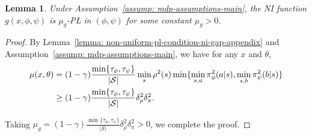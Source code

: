 \documentclass{article}
\theoremstyle{plain}
\newtheorem{lemma}{Lemma}
\theoremstyle{definition}
\theoremstyle{remark}
\def\cS{\mathcal S}
\begin{document}
\begin{lemma}
    \label{lemma: pl-condition-ni-gap}
    Under Assumption~\ref{assump: mdp-assumptions-main}, the NI function $g(x,\phi,\psi)$ is $\mu_g$-P{\L} in $(\phi,\psi)$ for some constant $\mu_g>0$.
\end{lemma}
\begin{proof}
    By Lemma~\ref{lemma: non-uniform-pl-condition-ni-gap-appendix} and Assumption~\ref{assump: mdp-assumptions-main}, we have for any $x$ and $\theta$,
    \begin{align}
        \mu(x,\theta) & = (1-\gamma)\frac{\min \{\tau_\phi,\tau_\psi\}}{|\cS|} \min_s \rho^2(s) \min\{ \min_{s,a}\pi^2_\phi(a|s), \min_{s,b} \pi^2_\psi(b|s) \} \notag\\
        & \geq (1-\gamma)\frac{\min \{\tau_\phi,\tau_\psi\}}{|\cS|} \delta_\rho^2 \delta_\pi^2 .
    \end{align}

    Taking $\mu_g = (1-\gamma)\frac{\min \{\tau_\phi,\tau_\psi\}}{|\cS|} \delta_\rho^2 \delta_\pi^2 > 0$, we complete the proof.
\end{proof}
\end{document}
